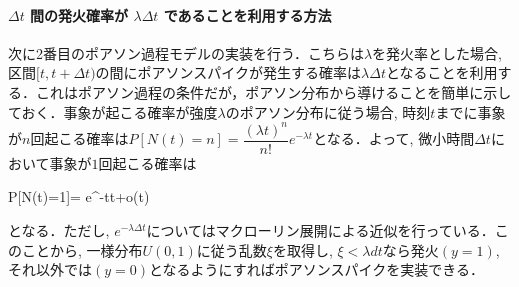 \paragraph{$\Delta t$ 間の発火確率が $\lambda\Delta t$ であることを利用する方法}
次に2番目のポアソン過程モデルの実装を行う．こちらは$\lambda$を発火率とした場合, 区間$[t, t+\Delta t)$の間にポアソンスパイクが発生する確率は$\lambda \Delta t$となることを利用する．これはポアソン過程の条件だが，ポアソン分布から導けることを簡単に示しておく．事象が起こる確率が強度$\lambda$のポアソン分布に従う場合, 時刻$t$までに事象が$n$回起こる確率は$P[N(t)=n]=\dfrac{(\lambda t)^{n}}{n !} e^{-\lambda t}$となる．よって, 微小時間$\Delta t$において事象が$1$回起こる確率は


P[N(\Delta t)=1]= e^{-\lambda \Delta t}\simeq \lambda \Delta t+o(\Delta t)


となる．ただし, $e^{-\lambda \Delta t}$についてはマクローリン展開による近似を行っている．このことから, 一様分布$U(0,1)$に従う乱数$\xi$を取得し, $\xi<\lambda dt$なら発火$(y=1)$, それ以外では$(y=0)$となるようにすればポアソンスパイクを実装できる．
